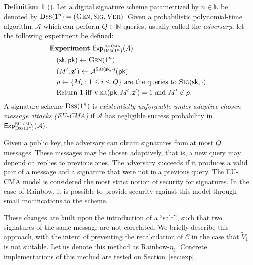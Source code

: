 \documentclass[12pt, a4paper, oneside]{memoir}
\theoremstyle{definition}
\newtheorem{definition}[theorem]{Definition}
\begin{document}
\begin{definition}[{\cite[Def.~1.2]{Chen:201612}}]
  Let a digital signature scheme parametrized by $n \in \mathbb{N}$ be denoted by $\textsc{Dss}(1^{n}) = (\textsc{Gen}, \textsc{Sig}, \textsc{Ver})$. Given a probabilistic polynomial-time algorithm $\mathcal{A}$ which can perform $Q \in \mathbb{N}$ queries, usually called the \emph{adversary}, let the following experiment be defined:
  \begin{align}
    \begin{split}
      &\textbf{Experiment } \mathsf{Exp}_{\textsc{Dss}(1^{n})}^{\textsc{eu-cma}}(\mathcal{A}) \\ 
      &\quad (\mathsf{sk}, \mathsf{pk}) \gets \textsc{Gen}(1^{n}) \\
      &\quad (M', \mathbf{z'}) \gets \mathcal{A}^{\textsc{Sig}(\mathsf{sk}, \cdot)}(\mathsf{pk}) \\
      &\quad \rho \gets \{ M_{i} : 1 \leq i \leq Q \} \text{ are the queries to } \textsc{Sig}(\mathsf{sk}, \cdot) \\
      &\quad \text{Return 1 iff } \textsc{Ver}(\mathsf{pk}, M', \mathsf{z'}) = 1 \text{ and } M' \not\in \rho.
    \end{split}
  \end{align}
  A signature scheme $\textsc{Dss}(1^{n})$ is \emph{existentially unforgeable under adaptive chosen message attacks (\textsf{EU-CMA})} if $\mathcal{A}$ has negligible success probability in $\mathsf{Exp}_{\textsc{Dss}(1^{n})}^{\textsc{eu-cma}}(\mathcal{A})$.
\end{definition}

Given a public key, the adversary can obtain signatures from at most $Q$ messages. These messages may be chosen adaptively, that is, a new query may depend on replies to previous ones. The adversary succeeds if it produces a valid pair of a message and a signature that were not in a previous query. The \textsf{EU-CMA} model is considered the most strict notion of security for signatures. In the case of Rainbow, it is possible to provide security against this model through small modifications to the scheme.

These changes are built upon the introduction of a ``salt'', such that two signatures of the same message are not correlated. We briefly describe this approach, with the intent of preventing the recalculation of $\overline{\mathcal{C}}$ in the case that $\widetilde{V}_{1}$ is not suitable. Let us denote this method as Rainbow-$\eta_{3}$. Concrete implementations of this method are tested on Section~\ref{sec:exp}.
\end{document}
